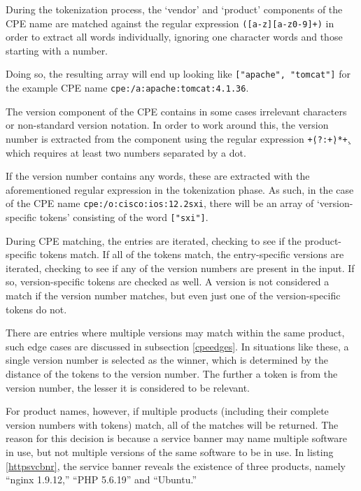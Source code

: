 \documentclass[a4paper,12pt]{article}
\begin{document}
	During the tokenization process, the `vendor' and `product' components of the CPE name are matched against the regular expression \texttt{([a-z][a-z0-9]+)} in order to extract all words individually, ignoring one character words and those starting with a number.
	
	Doing so, the resulting array will end up looking like \texttt{["apache", "tomcat"]} for the example CPE name \texttt{cpe:/a:apache:tomcat:4.1.36}.
	
	The version component of the CPE contains in some cases irrelevant characters or non-standard version notation. In order to work around this, the version number is extracted from the component using the regular expression \texttt{\d+\.(?:\d+\.)*\d+}, which requires at least two numbers separated by a dot.
	
	If the version number contains any words, these are extracted with the aforementioned regular expression in the tokenization phase. As such, in the case of the CPE name \texttt{cpe:/o:cisco:ios:12.2sxi}, there will be an array of `version-specific tokens' consisting of the word \texttt{["sxi"]}.
	
	During CPE matching, the entries are iterated, checking to see if the product-specific tokens match. If all of the tokens match, the entry-specific versions are iterated, checking to see if any of the version numbers are present in the input. If so, version-specific tokens are checked as well. A version is not considered a match if the version number matches, but even just one of the version-specific tokens do not.
	
	There are entries where multiple versions may match within the same product, such edge cases are discussed in subsection \ref{cpeedges}. In situations like these, a single version number is selected as the winner, which is determined by the distance of the tokens to the version number. The further a token is from the version number, the lesser it is considered to be relevant.
	
	For product names, however, if multiple products (including their complete version numbers with tokens) match, all of the matches will be returned. The reason for this decision is because a service banner may name multiple software in use, but not multiple versions of the same software to be in use. In listing \ref{httpsvcbnr}, the service banner reveals the existence of three products, namely ``nginx 1.9.12,'' ``PHP 5.6.19'' and ``Ubuntu.''
	
\end{document}
